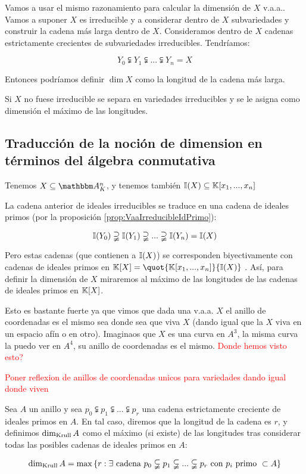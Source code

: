 Vamos a usar el mismo razonamiento para calcular la dimensión de $X$ v.a.a.. Vamos a suponer $X$ es irreducible y a considerar dentro de $X$ subvariedades y construir la cadena más larga dentro de $X$. Consideramos dentro de $X$ cadenas estrictamente crecientes de subvariedades irreducibles. Tendríamos:

$$Y_0 \subsetneqq Y_1 \subsetneqq ... \subsetneqq Y_n=X$$

Entonces podríamos definir $\dim X$ como la longitud de la cadena más larga.

Si $X$ no fuese irreducible se separa en variedades irreducibles y se le asigna como dimensión el máximo de las longitudes.

\subsection{Traducción de la noción de dimension en términos del álgebra conmutativa}

Tenemos $X \subseteq  \Akn$, y tenemos también $\mathbb{I}(X) \subseteq \mathbb{K}[x_1,...,x_n]$

La cadena anterior de ideales irreducibles se traduce en una cadena de ideales  primos (por la proposición \ref{prop:VaaIrreducibleIdPrimo}):

$$\mathbb{I}(Y_0) \supsetneqq \mathbb{I}(Y_1) \supsetneqq ... \supsetneqq \mathbb{I}(Y_n)=\mathbb{I}(X)$$

Pero estas cadenas (que contienen a $\mathbb{I}(X)$) se corresponden biyectivamente con cadenas de ideales primos en $\K[X]=\quot{\K[x_1,...,x_n]}{\I(X)}$ . Así, para definir la dimensión de $X$ miraremos al máximo de las longitudes de las cadenas  de ideales primos en $\mathbb{K}[X]$.

Esto es bastante fuerte ya que vimos que dada una v.a.a. $X$ el anillo de coordenadas es el mismo sea donde sea que viva $X$ (dando igual que la $X$ viva en un espacio afín o en otro). Imaginaos que $X$ es una curva en $A^3$, la misma curva la puedo ver en $A^4$, su anillo de coordenadas es el mismo. \textcolor{red}{Donde hemos visto esto?}

\textcolor{red}{Poner reflexion de anillos de coordenadas unicos para variedades dando igual donde viven}

\begin{defn} \label{def:DimKrull}
	Sea $A$ un anillo y sea $p_0 \subsetneqq p_1 \subsetneqq ... \subsetneqq p_r$ una cadena estrictamente creciente de ideales primos en $A$. En tal caso, diremos que la longitud de la cadena es $r$, y definimos $\dim_{\mathrm{Krull}} A$ como el máximo (si existe) de las longitudes tras considerar todas las posibles cadenas de ideales primos en $A$:

	$$ \dim_{\mathrm{Krull}} A = \max \left\{ r: \exists \text{ cadena } p_0 \subsetneqq p_1 \subsetneqq ... \subsetneqq p_r \text{ con } p_i \text{ primo } \subset A \right\} $$
\end{defn}

